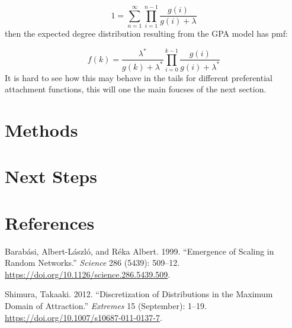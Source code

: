 \documentclass[
  10pt,
  a4paper,
]{scrreprt}
\newlength{\cslhangindent}
\newlength{\cslentryspacingunit} %
\newenvironment{CSLReferences}[2] %
 {%
  \setlength{\parindent}{0pt}
  \ifodd #1
  \let\oldpar\par
  \def\par{\hangindent=\cslhangindent\oldpar}
  \fi
  \setlength{\parskip}{#2\cslentryspacingunit}
 }%
 {}
\theoremstyle{plain}
\theoremstyle{definition}
\theoremstyle{remark}
\begin{document}
{\[
1=\sum_{n=1}^\infty \prod_{i=1}^{n-1}\frac{g(i)}{g(i)+\lambda}
\] then the expected degree distribution resulting from the GPA model
has pmf:

\[
f(k) = \frac{\lambda^*}{g(k) + \lambda^*}\prod_{i=0}^{k-1}\frac{g(i)}{g(i)+\lambda^*}
\] It is hard to see how this may behave in the tails for different
preferential attachment functions, this will one the main foucses of the
next section.

\hypertarget{sec-meth}{%
\chapter{Methods}\label{sec-meth}}

\hypertarget{next-steps}{%
\chapter{Next Steps}\label{next-steps}}

\newpage{}

\hypertarget{references}{%
\chapter*{References}\label{references}}

\hypertarget{refs}{}
\begin{CSLReferences}{1}{0}
\leavevmode{}%
Barabási, Albert-László, and Réka Albert. 1999. {``Emergence of Scaling
in Random Networks.''} \emph{Science} 286 (5439): 509--12.
\url{https://doi.org/10.1126/science.286.5439.509}.

\leavevmode{}%
Shimura, Takaaki. 2012. {``Discretization of Distributions in the
Maximum Domain of Attraction.''} \emph{Extremes} 15 (September): 1--19.
\url{https://doi.org/10.1007/s10687-011-0137-7}.

\end{CSLReferences}
\end{document}
